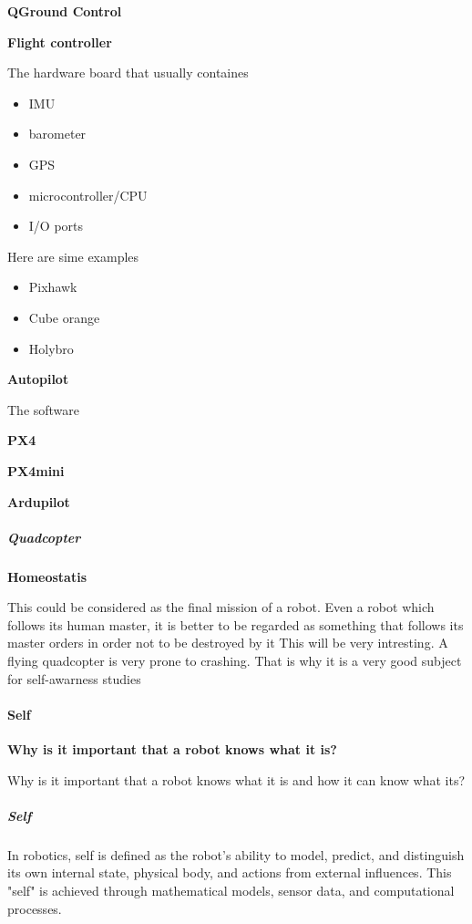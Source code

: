 \documentclass{book}
\providecommand{\ProjectDeepHeading}[2]{%
    \par\medskip\noindent\textbf{#2}\par\smallskip
}
\begin{document}
    
    \ProjectDeepHeading{1}{QGround Control}
    
    
    \ProjectDeepHeading{1}{Flight controller}
    The hardware board that usually containes
    \begin{itemize}
        \item IMU
        \item barometer
        \item GPS
        \item microcontroller/CPU
        \item I/O ports
    \end{itemize}
    
    Here are sime examples
    \begin{itemize}
        \item Pixhawk
        \item Cube orange
        \item Holybro
    \end{itemize}
    
    
    \ProjectDeepHeading{1}{Autopilot}
    The software
    
    \ProjectDeepHeading{2}{PX4}
    
    \ProjectDeepHeading{2}{PX4mini}
    
    \ProjectDeepHeading{2}{Ardupilot}
    
\subparagraph{Quadcopter}
    \ProjectDeepHeading{1}{Homeostatis}
    This could be considered as the final mission of a robot. Even a robot which follows its human master, it is better to be regarded as something that follows its master orders in order not to be destroyed by it
    This will be very intresting. A flying quadcopter is very prone to crashing. That is why it is a very good subject for self-awarness studies


\paragraph{Self}


\ProjectDeepHeading{3}{Why is it important that a robot knows what it is?}
    Why is it important that a robot knows what it is and how it can know what its?

\subparagraph{Self}
In robotics, self is defined as the robot's ability to model, predict, and distinguish its own internal state, physical body, and actions from external influences. This "self" is achieved through mathematical models, sensor data, and computational processes.
\end{document}
